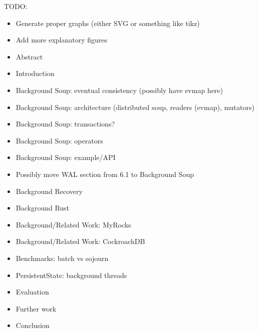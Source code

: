 \color{purple}
TODO:
\begin{itemize}
  \item Generate proper graphs (either SVG or something like tikz)
  \item Add more explanatory figures

  \item Abstract
  \item Introduction

  \item Background Soup: eventual consistency (possibly have evmap here)
  \item Background Soup: architecture (distributed soup, readers (evmap), mutators)
  \item Background Soup: transactions?
  \item Background Soup: operators
  \item Background Soup: example/API
  \item Possibly move WAL section from 6.1 to Background Soup

  \item Background Recovery
  \item Background Rust

  \item Background/Related Work: MyRocks
  \item Background/Related Work: CockroachDB

  \item Benchmarks: batch vs sojourn

  \item PersistentState: background threads

  \item Evaluation
  \item Further work
  \item Conclusion
\end{itemize}

